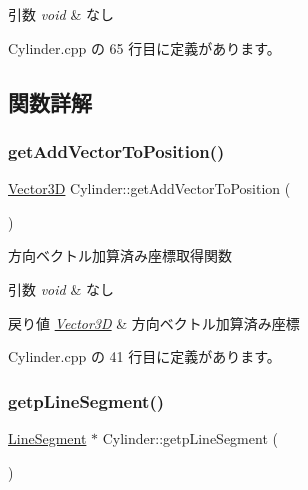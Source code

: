 \begin{DoxyParams}{引数}
{\em void} & なし \\
\hline
\end{DoxyParams}


 Cylinder.\+cpp の 65 行目に定義があります。



\subsection{関数詳解}
\mbox{\label{class_cylinder_af36a39d5a18d1a837d9880a00447d87b}} 
\subsubsection{\texorpdfstring{get\+Add\+Vector\+To\+Position()}{getAddVectorToPosition()}}
{\footnotesize\ttfamily \mbox{\hyperlink{class_vector3_d}{Vector3D}} Cylinder\+::get\+Add\+Vector\+To\+Position (\begin{DoxyParamCaption}{ }\end{DoxyParamCaption})}



方向ベクトル加算済み座標取得関数 


\begin{DoxyParams}{引数}
{\em void} & なし \\
\hline
\end{DoxyParams}

\begin{DoxyRetVals}{戻り値}
{\em \mbox{\hyperlink{class_vector3_d}{Vector3D}}} & 方向ベクトル加算済み座標 \\
\hline
\end{DoxyRetVals}


 Cylinder.\+cpp の 41 行目に定義があります。

\mbox{\label{class_cylinder_af6e950f09496e5aac060a3f297da3ae2}} 
\subsubsection{\texorpdfstring{getp\+Line\+Segment()}{getpLineSegment()}}
{\footnotesize\ttfamily \mbox{\hyperlink{class_line_segment}{Line\+Segment}} $\ast$ Cylinder\+::getp\+Line\+Segment (\begin{DoxyParamCaption}{ }\end{DoxyParamCaption})}



